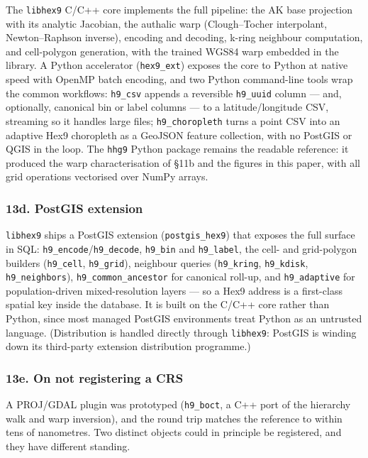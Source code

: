 \documentclass[
  11pt,
  a4paper,
]{article}
\begin{document}
The \texttt{libhex9} C/C++ core implements the full pipeline: the AK
base projection with its analytic Jacobian, the authalic warp
(Clough--Tocher interpolant, Newton--Raphson inverse), encoding and
decoding, k-ring neighbour computation, and cell-polygon generation,
with the trained WGS84 warp embedded in the library. A Python
accelerator (\texttt{hex9\_ext}) exposes the core to Python at native
speed with OpenMP batch encoding, and two Python command-line tools wrap
the common workflows: \texttt{h9\_csv} appends a reversible
\texttt{h9\_uuid} column --- and, optionally, canonical bin or label
columns --- to a latitude/longitude CSV, streaming so it handles large
files; \texttt{h9\_choropleth} turns a point CSV into an adaptive Hex9
choropleth as a GeoJSON feature collection, with no PostGIS or QGIS in
the loop. The \texttt{hhg9} Python package remains the readable
reference: it produced the warp characterisation of §11b and the figures
in this paper, with all grid operations vectorised over NumPy arrays.

\subsubsection{13d. PostGIS extension}\label{d.-postgis-extension}

\texttt{libhex9} ships a PostGIS extension (\texttt{postgis\_hex9}) that
exposes the full surface in SQL:
\texttt{h9\_encode}/\texttt{h9\_decode}, \texttt{h9\_bin} and
\texttt{h9\_label}, the cell- and grid-polygon builders
(\texttt{h9\_cell}, \texttt{h9\_grid}), neighbour queries
(\texttt{h9\_kring}, \texttt{h9\_kdisk}, \texttt{h9\_neighbors}),
\texttt{h9\_common\_ancestor} for canonical roll-up, and
\texttt{h9\_adaptive} for population-driven mixed-resolution layers ---
so a Hex9 address is a first-class spatial key inside the database. It
is built on the C/C++ core rather than Python, since most managed
PostGIS environments treat Python as an untrusted language.
(Distribution is handled directly through \texttt{libhex9}: PostGIS is
winding down its third-party extension distribution programme.)

\subsubsection{13e. On not registering a
CRS}\label{e.-on-not-registering-a-crs}

A PROJ/GDAL plugin was prototyped (\texttt{h9\_boct}, a C++ port of the
hierarchy walk and warp inversion), and the round trip matches the
reference to within tens of nanometres. Two distinct objects could in
principle be registered, and they have different standing.
\end{document}
